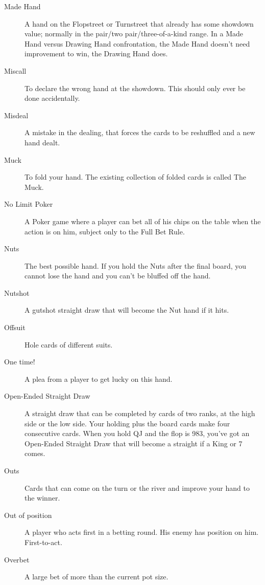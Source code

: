 \begin{description}
\item[Made Hand] A hand on the Flopstreet or Turnstreet that already
has some showdown value; normally in the pair/two pair/three-of-a-kind
range. In a Made Hand versus Drawing Hand confrontation, the Made Hand
doesn't need improvement to win, the Drawing Hand does.

\item[Miscall] To declare the wrong hand at the showdown. This should
only ever be done accidentally.

\item[Misdeal] A mistake in the dealing, that forces the cards to be
reshuffled and a new hand dealt.

\item[Muck] To fold your hand. The existing collection of folded cards
is called The Muck.

\item[No Limit Poker] A Poker game where a player can bet all of his
chips on the table when the action is on him, subject only to the Full
Bet Rule.

\item[Nuts] The best possible hand. If you hold the Nuts
after the final board, you cannot lose the hand and you can't be
bluffed off the hand.

\item[Nutshot] A gutshot straight draw that will become the Nut hand
if it hits.

\item[Offsuit] Hole cards of different suits.

\item[One time!] A plea from a player to get lucky on this hand.

\item[Open-Ended Straight Draw] A straight draw that can be completed
by cards of two ranks, at the high side or the low side. Your holding
plus the board cards make four consecutive cards. When you hold QJ
and the flop is 983, you've got an Open-Ended Straight Draw that will
become a straight if a King or 7 comes.

\item[Outs] Cards that can come on the turn or the river and improve
your hand to the winner.

\item[Out of position] A player who acts first in a betting round. His
enemy has position on him. First-to-act.

\item[Overbet] A large bet of more than the current pot size.


\end{description}
